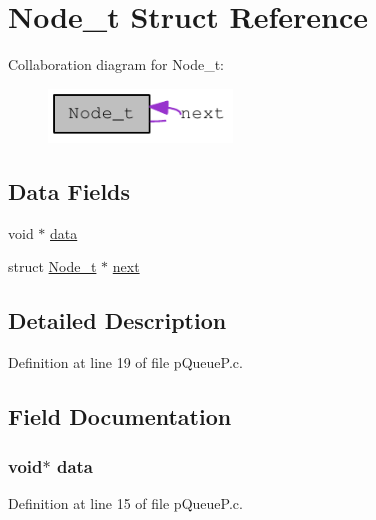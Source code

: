 \hypertarget{struct_node__t}{
\section{Node\_\-t Struct Reference}
\label{struct_node__t}
}


Collaboration diagram for Node\_\-t:\nopagebreak
\begin{figure}[H]
\begin{center}
\leavevmode
\includegraphics[width=139pt]{struct_node__t__coll__graph}
\end{center}
\end{figure}
\subsection*{Data Fields}
\begin{DoxyCompactItemize}
\item 
void $\ast$ \hyperlink{struct_node__t_a735984d41155bc1032e09bece8f8d66d}{data}
\item 
struct \hyperlink{struct_node__t}{Node\_\-t} $\ast$ \hyperlink{struct_node__t_a5e58c48351200ad246d4db491634433c}{next}
\end{DoxyCompactItemize}


\subsection{Detailed Description}


Definition at line 19 of file pQueueP.c.



\subsection{Field Documentation}
\hypertarget{struct_node__t_a735984d41155bc1032e09bece8f8d66d}{
\subsubsection[{data}]{\setlength{\rightskip}{0pt plus 5cm}void$\ast$ {\bf data}}}
\label{struct_node__t_a735984d41155bc1032e09bece8f8d66d}


Definition at line 15 of file pQueueP.c.

